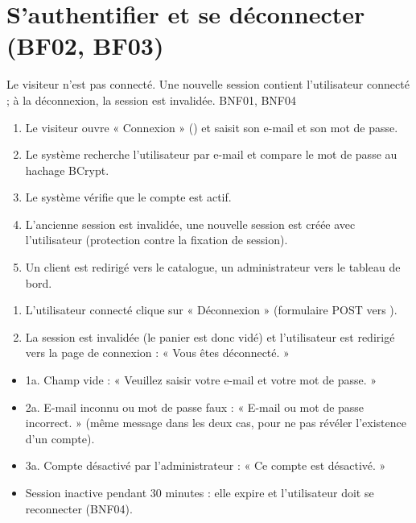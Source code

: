 \section{S'authentifier et se déconnecter (BF02, BF03)}

  {Le visiteur n'est pas connecté.}
  {Une nouvelle session contient l'utilisateur connecté ; à la déconnexion, la session est invalidée.}
  {BNF01, BNF04}

\begin{enumerate}
  \item Le visiteur ouvre « Connexion » () et saisit son e-mail et son mot de passe.
  \item Le système recherche l'utilisateur par e-mail et compare le mot de passe au hachage BCrypt.
  \item Le système vérifie que le compte est actif.
  \item L'ancienne session est invalidée, une nouvelle session est créée avec l'utilisateur (protection contre
        la fixation de session).
  \item Un client est redirigé vers le catalogue, un administrateur vers le tableau de bord.
\end{enumerate}

\begin{enumerate}
  \item L'utilisateur connecté clique sur « Déconnexion » (formulaire POST vers ).
  \item La session est invalidée (le panier est donc vidé) et l'utilisateur est redirigé vers la page de
        connexion : « Vous êtes déconnecté. »
\end{enumerate}

\begin{itemize}
  \item 1a. Champ vide : « Veuillez saisir votre e-mail et votre mot de passe. »
  \item 2a. E-mail inconnu ou mot de passe faux : « E-mail ou mot de passe incorrect. » (même message dans les deux
        cas, pour ne pas révéler l'existence d'un compte).
  \item 3a. Compte désactivé par l'administrateur : « Ce compte est désactivé. »
  \item Session inactive pendant 30 minutes : elle expire et l'utilisateur doit se reconnecter (BNF04).
\end{itemize}

